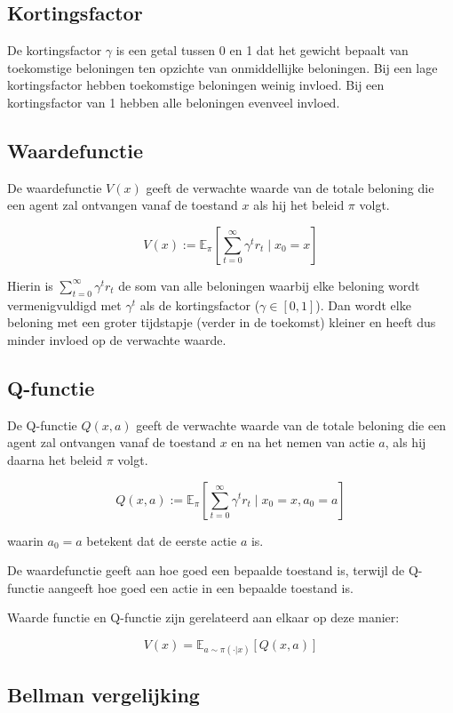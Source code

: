 \documentclass[a4paper,12pt]{report}
\begin{document}
\subsection*{Kortingsfactor}

De kortingsfactor \(\gamma\) is een getal tussen 0 en 1 dat het gewicht bepaalt
van toekomstige beloningen ten opzichte van onmiddellijke beloningen. Bij een
lage kortingsfactor hebben toekomstige beloningen weinig invloed. Bij een
kortingsfactor van 1 hebben alle beloningen evenveel invloed.

\subsection*{Waardefunctie}

De waardefunctie \(V(x)\) geeft de verwachte waarde van de totale beloning die
een agent zal ontvangen vanaf de toestand \(x\) als hij het beleid \(\pi\)
volgt.

\[
    V(x) := \mathbb{E}_{\pi}\left[\sum_{t=0}^{\infty} \gamma^t r_t \mid x_0 = x\right]
\]

Hierin is \(\sum_{t=0}^{\infty} \gamma^t r_t\) de som van alle beloningen
waarbij elke beloning wordt vermenigvuldigd met \(\gamma^t\) als de
kortingsfactor (\(\gamma \in [0,1]\)). Dan wordt elke beloning met een groter
tijdstapje (verder in de toekomst) kleiner en heeft dus minder invloed op de
verwachte waarde.

\subsection*{Q-functie}

De Q-functie \(Q(x,a)\) geeft de verwachte waarde van de totale beloning die
een agent zal ontvangen vanaf de toestand \(x\) en na het nemen van actie
\(a\), als hij daarna het beleid \(\pi\) volgt.

\[
    Q(x,a) := \mathbb{E}_{\pi}\left[\sum_{t=0}^{\infty} \gamma^t r_t \mid x_0 = x, a_0 = a\right]
\]

\noindent waarin \(a_0 = a\) betekent dat de eerste actie \(a\) is.

De waardefunctie geeft aan hoe goed een bepaalde toestand is, terwijl de
Q-functie aangeeft hoe goed een actie in een bepaalde toestand is.

Waarde functie en Q-functie zijn gerelateerd aan elkaar op deze manier:

\[
    V(x) = \mathbb{E}_{a \sim \pi(\cdot|x)}[Q(x,a)]
\]

\subsection*{Bellman vergelijking}
\end{document}
